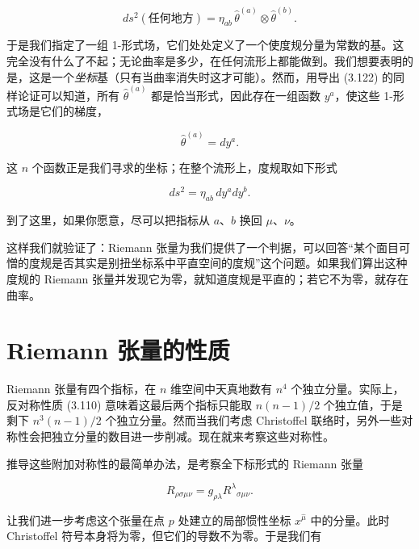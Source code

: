 \begin{equation*}
ds^2(\text{任何地方}) = \eta_{ab}\, \hat\theta^{(a)}\otimes\hat\theta^{(b)}. \tag{3.124}
\end{equation*}

于是我们指定了一组 1-形式场，它们处处定义了一个使度规分量为常数的基。这完全没有什么了不起；无论曲率是多少，在任何流形上都能做到。我们想要表明的是，这是一个\emph{坐标}基（只有当曲率消失时这才可能）。然而，用导出 (3.122) 的同样论证可以知道，所有 $\hat\theta^{(a)}$ 都是恰当形式，因此存在一组函数 $y^a$，使这些 1-形式场是它们的梯度，

\begin{equation*}
\hat\theta^{(a)} = dy^a. \tag{3.125}
\end{equation*}

这 $n$ 个函数正是我们寻求的坐标；在整个流形上，度规取如下形式

\begin{equation*}
ds^2 = \eta_{ab}\, dy^a dy^b. \tag{3.126}
\end{equation*}

到了这里，如果你愿意，尽可以把指标从 $a$、$b$ 换回 $\mu$、$\nu$。

这样我们就验证了：Riemann 张量为我们提供了一个判据，可以回答“某个面目可憎的度规是否其实是别扭坐标系中平直空间的度规”这个问题。如果我们算出这种度规的 Riemann 张量并发现它为零，就知道度规是平直的；若它不为零，就存在曲率。

\section{Riemann 张量的性质}

Riemann 张量有四个指标，在 $n$ 维空间中天真地数有 $n^4$ 个独立分量。实际上，反对称性质 (3.110) 意味着这最后两个指标只能取 $n(n-1)/2$ 个独立值，于是剩下 $n^3(n-1)/2$ 个独立分量。然而当我们考虑 Christoffel 联络时，另外一些对称性会把独立分量的数目进一步削减。现在就来考察这些对称性。

推导这些附加对称性的最简单办法，是考察全下标形式的 Riemann 张量

\begin{equation*}
R_{\rho\sigma\mu\nu} = g_{\rho\lambda}R^\lambda{}_{\sigma\mu\nu}. \tag{3.127}
\end{equation*}

让我们进一步考虑这个张量在点 $p$ 处建立的局部惯性坐标 $x^{\hat\mu}$ 中的分量。此时 Christoffel 符号本身将为零，但它们的导数不为零。于是我们有

